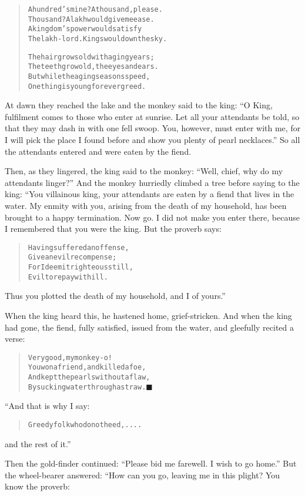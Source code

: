 \documentclass[article, twoside, 14pt]{memoir}
\newcommand{\qed}{\hfill \ensuremath{\blacksquare}}
\renewenvironment{verbatim}{%
\begin{quote}%
\vskip -10pt%
\begin{alltt}\normalfont\large}{\end{alltt}%
\end{quote}%
\vskip -10pt
} %
\begin{document}
\begin{verbatim}
A hundred's mine? A thousand, please.
Thousand? A lakh would give me ease.
A kingdom's power would satisfy
The lakh-lord. Kings would own the sky.

The hair grows old with aging years;
The teeth grow old, the eyes and ears.
But while the aging seasons speed,
One thing is young forever{\textemdash}greed.
\end{verbatim}
At dawn they reached the lake and the monkey said to the king:
``O King, fulfilment comes to those who enter at sunrise. Let all your attendants be told, so that they may dash in with one fell swoop. You, however, must enter with me, for I will pick the place I found before and show you plenty of pearl necklaces.''
So all the attendants entered and were eaten by the fiend.

Then, as they lingered, the king said to the monkey:
``Well, chief, why do my attendants linger?'' And the monkey
hurriedly climbed a tree before saying to the king: “You villainous
king, your attendants are eaten by a fiend that lives in the water.
My enmity with you, arising from the death of my household, has
been brought to a happy termination. Now go. I did not make you
enter there, because I remembered that you were the king. But the
proverb says:

\begin{verbatim}
Having suffered an offense,
Give an evil recompense;
For I deem it righteous still,
Evil to repay with ill.
\end{verbatim}
Thus you plotted the death of my household, and I of yours.”

When the king heard this, he hastened home, grief-stricken.
And when the king had gone, the fiend, fully satisfied, issued from
the water, and gleefully recited a verse:

\begin{verbatim}
Very good, my monkey-o!
You won a friend, and killed a foe,
And kept the pearls without a flaw,
By sucking water through a straw.\hyperref[s87]{\qed}
\end{verbatim}
“And that is why I say:

\begin{verbatim}
Greedy folk who do not heed, ....
\end{verbatim}
and the rest of it.”

Then the gold-finder continued:
``Please bid me farewell. I wish to go home.'' But the wheel-bearer
answered: “How can you go, leaving me in this plight? You know the
proverb:
\end{document}
